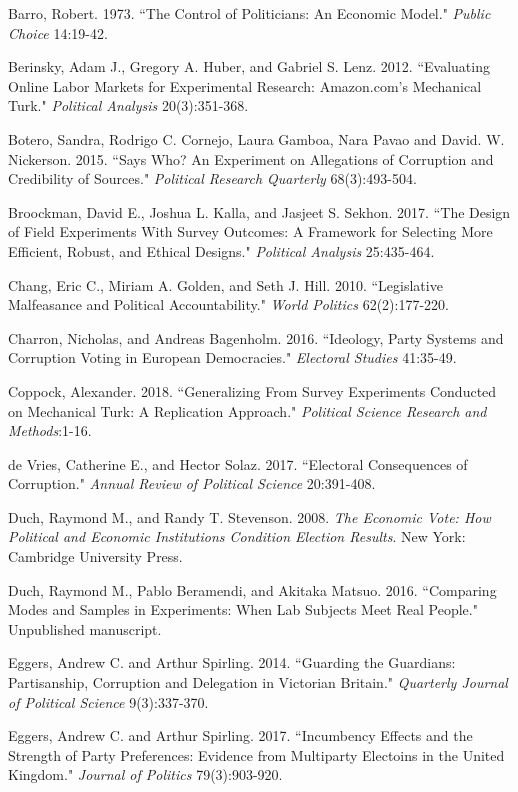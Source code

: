 \documentclass[11pt]{article}
\begin{document}
\begin{thebibliography}{56}
Barro, Robert. 1973. “The Control of Politicians: An Economic Model." \textit{Public Choice} 14:19-42.

Berinsky, Adam J., Gregory A. Huber, and Gabriel S. Lenz. 2012. “Evaluating Online Labor Markets for Experimental Research: Amazon.com's Mechanical Turk." \textit{Political Analysis} 20(3):351-368.

Botero, Sandra, Rodrigo C. Cornejo, Laura Gamboa, Nara Pavao and David. W. Nickerson. 2015. “Says Who? An Experiment on Allegations of Corruption and Credibility of Sources." \textit{Political Research Quarterly} 68(3):493-504.

Broockman, David E., Joshua L. Kalla, and Jasjeet S. Sekhon. 2017. “The Design of Field Experiments With Survey Outcomes: A Framework for Selecting More Efficient, Robust, and Ethical Designs." \textit{Political Analysis} 25:435-464.

Chang, Eric C., Miriam A. Golden, and Seth J. Hill. 2010. “Legislative Malfeasance and Political Accountability." \textit{World Politics} 62(2):177-220.

Charron, Nicholas, and Andreas Bagenholm. 2016. “Ideology, Party Systems and Corruption Voting in European Democracies." \textit{Electoral Studies} 41:35-49.

Coppock, Alexander. 2018. “Generalizing From Survey Experiments Conducted on Mechanical Turk: A Replication Approach." \textit{Political Science Research and Methods}:1-16.

de Vries, Catherine E., and Hector Solaz. 2017. “Electoral Consequences of Corruption." \textit{Annual Review of Political Science} 20:391-408.

Duch, Raymond M., and Randy T. Stevenson. 2008. \textit{The Economic Vote: How Political and Economic Institutions Condition Election Results}. New York: Cambridge University Press.

Duch, Raymond M., Pablo Beramendi, and Akitaka Matsuo. 2016. “Comparing Modes and Samples in Experiments: When Lab Subjects Meet Real People." Unpublished manuscript.

Eggers, Andrew C. and Arthur Spirling. 2014. “Guarding the Guardians: Partisanship, Corruption and Delegation in Victorian Britain." \textit{Quarterly Journal of Political Science} 9(3):337-370.

Eggers, Andrew C. and Arthur Spirling. 2017. “Incumbency Effects and the Strength of Party Preferences: Evidence from Multiparty Electoins in the United Kingdom." \textit{Journal of Politics} 79(3):903-920.


\end{thebibliography}
\end{document}
